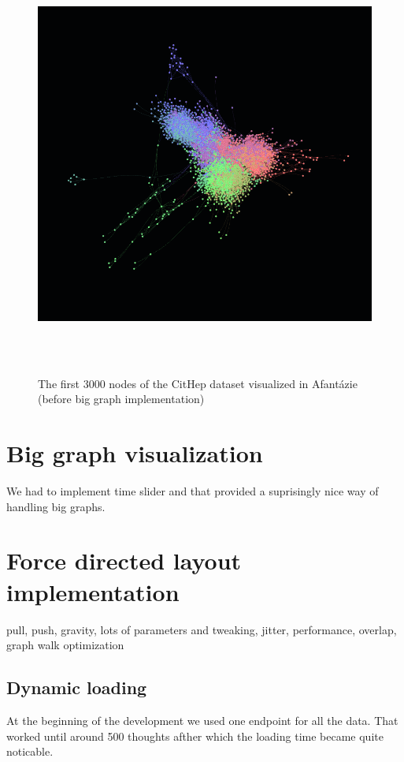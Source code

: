\begin{figure}[p]\centering
    \includegraphics[width=140mm, height=140mm]{img/Afantazie_cithep_3000.png}
    \caption{The first 3000 nodes of the CitHep dataset visualized in Afantázie (before big graph implementation)}
    \label{obr:afantazie_cithep_3k}
\end{figure}
  

\section{Big graph visualization}
We had to implement time slider and that provided a suprisingly nice way of handling big graphs.

\section{Force directed layout implementation}
pull, push, gravity, lots of parameters and tweaking, jitter, performance, overlap, graph walk optimization

\subsection{Dynamic loading}
At the beginning of the development we used one endpoint for all the data. That worked until around 500 thoughts afther which the loading time became quite noticable. 

